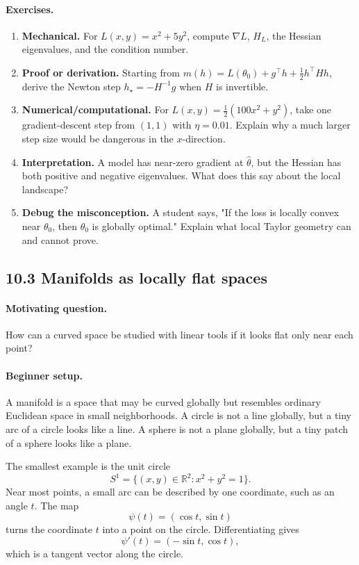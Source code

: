 \paragraph{Exercises.}
\begin{enumerate}[label=\textbf{10.2.\arabic*.}, leftmargin=*]
\item \textbf{Mechanical.} For \(L(x,y)=x^2+5y^2\), compute \(\nabla L\), \(H_L\), the Hessian eigenvalues, and the condition number.
\item \textbf{Proof or derivation.} Starting from \(m(h)=L(\theta_0)+g^\top h+\frac{1}{2}h^\top Hh\), derive the Newton step \(h_\star=-H^{-1}g\) when \(H\) is invertible.
\item \textbf{Numerical/computational.} For \(L(x,y)=\frac{1}{2}(100x^2+y^2)\), take one gradient-descent step from \((1,1)\) with \(\eta=0.01\). Explain why a much larger step size would be dangerous in the \(x\)-direction.
\item \textbf{Interpretation.} A model has near-zero gradient at \(\hat{\theta}\), but the Hessian has both positive and negative eigenvalues. What does this say about the local landscape?
\item \textbf{Debug the misconception.} A student says, "If the loss is locally convex near \(\theta_0\), then \(\theta_0\) is globally optimal." Explain what local Taylor geometry can and cannot prove.
\end{enumerate}

\subsection{10.3 Manifolds as locally flat spaces}

\paragraph{Motivating question.}
How can a curved space be studied with linear tools if it looks flat only near each point?

\paragraph{Beginner setup.}
A manifold is a space that may be curved globally but resembles ordinary Euclidean space in small neighborhoods. A circle is not a line globally, but a tiny arc of a circle looks like a line. A sphere is not a plane globally, but a tiny patch of a sphere looks like a plane.

The smallest example is the unit circle
\[
S^1=\{(x,y)\in\mathbb{R}^2:x^2+y^2=1\}.
\]
Near most points, a small arc can be described by one coordinate, such as an angle \(t\). The map
\[
\psi(t)=(\cos t,\sin t)
\]
turns the coordinate \(t\) into a point on the circle. Differentiating gives
\[
\psi'(t)=(-\sin t,\cos t),
\]
which is a tangent vector along the circle.

